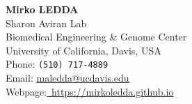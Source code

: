 \documentclass{CV}
\newcommand{\mail}[1]{\href{mailto:#1}{#1}}
\begin{document}
\begin{center}
	{\textbf{\LARGE Mirko LEDDA}}\\
	Sharon Aviran Lab\\
	Biomedical Engineering \& Genome Center\\
	University of California, Davis, USA\\
	Phone: \texttt{(510) 717-4889}\\
	Email: \mail{maledda@ucdavis.edu}\\
	Webpage:\href{https://mirkoledda.github.io}{~https://mirkoledda.github.io}\\
\end{center}
~








\end{document}
